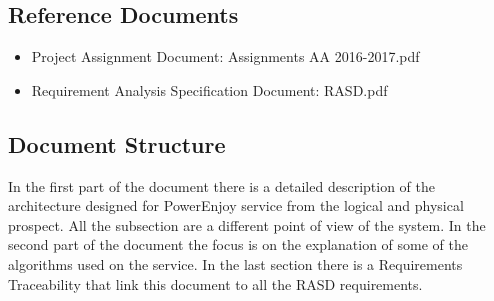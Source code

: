 \subsection{Reference Documents}
\begin{itemize}
	\item Project Assignment Document: Assignments AA 2016-2017.pdf 
	\item Requirement Analysis Specification Document: RASD.pdf 
\end{itemize}

\subsection{Document Structure }
In the first part of the document there is a detailed description of the architecture designed for PowerEnjoy service from the logical and physical prospect. All the subsection are a different point of view of the system.
In the second part of the document the focus is on the explanation of some of the algorithms used on the service. In the last section there is a Requirements Traceability that link this document to all the RASD requirements.


\newpage